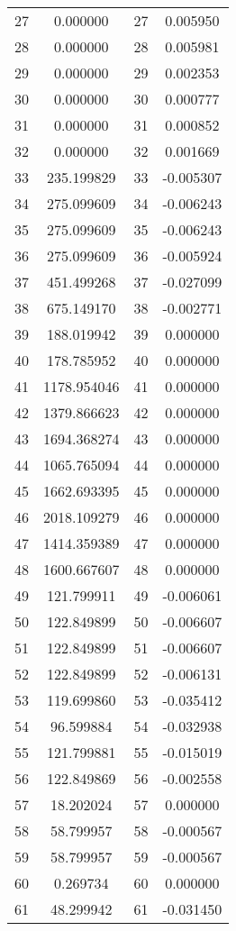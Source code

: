 \documentclass[12pt]{article}
\begin{document}
\begin{longtable}{@{}cccc@{}}
27 & 0.000000 & 27 & 0.005950 \\
28 & 0.000000 & 28 & 0.005981 \\
29 & 0.000000 & 29 & 0.002353 \\
30 & 0.000000 & 30 & 0.000777 \\
31 & 0.000000 & 31 & 0.000852 \\
32 & 0.000000 & 32 & 0.001669 \\
33 & 235.199829 & 33 & -0.005307 \\
34 & 275.099609 & 34 & -0.006243 \\
35 & 275.099609 & 35 & -0.006243 \\
36 & 275.099609 & 36 & -0.005924 \\
37 & 451.499268 & 37 & -0.027099 \\
38 & 675.149170 & 38 & -0.002771 \\
39 & 188.019942 & 39 & 0.000000 \\
40 & 178.785952 & 40 & 0.000000 \\
41 & 1178.954046 & 41 & 0.000000 \\
42 & 1379.866623 & 42 & 0.000000 \\
43 & 1694.368274 & 43 & 0.000000 \\
44 & 1065.765094 & 44 & 0.000000 \\
45 & 1662.693395 & 45 & 0.000000 \\
46 & 2018.109279 & 46 & 0.000000 \\
47 & 1414.359389 & 47 & 0.000000 \\
48 & 1600.667607 & 48 & 0.000000 \\
49 & 121.799911 & 49 & -0.006061 \\
50 & 122.849899 & 50 & -0.006607 \\
51 & 122.849899 & 51 & -0.006607 \\
52 & 122.849899 & 52 & -0.006131 \\
53 & 119.699860 & 53 & -0.035412 \\
54 & 96.599884 & 54 & -0.032938 \\
55 & 121.799881 & 55 & -0.015019 \\
56 & 122.849869 & 56 & -0.002558 \\
57 & 18.202024 & 57 & 0.000000 \\
58 & 58.799957 & 58 & -0.000567 \\
59 & 58.799957 & 59 & -0.000567 \\
60 & 0.269734 & 60 & 0.000000 \\
61 & 48.299942 & 61 & -0.031450 \\

\end{longtable}
\end{document}
